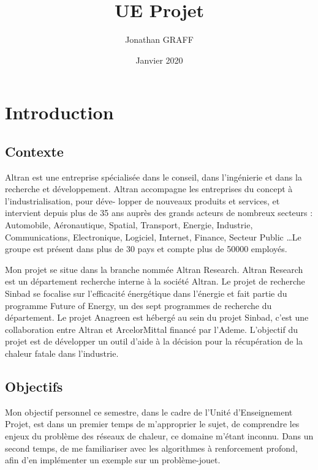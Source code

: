 


\renewcommand{\thesection}{\Roman{section})}
\renewcommand{\thesubsection}{\Roman{section}.\arabic{subsection})}
\renewcommand{\contentsname}{Sommaire}
\renewcommand{\bibname}{Bibliographie}
\title{UE Projet}
\author{Jonathan GRAFF}
\date{Janvier 2020}
\maketitle
\tableofcontents
\newpage

\section{Introduction}
\subsection{Contexte}

Altran est une entreprise spécialisée dans le conseil, dans l'ingénierie et dans la recherche et développement. Altran accompagne les entreprises du concept à l'industrialisation, pour déve-
lopper de nouveaux produits et services, et intervient depuis plus de 35 ans auprès des grands
acteurs de nombreux secteurs : Automobile, Aéronautique, Spatial, Transport, Energie, Industrie, Communications, Electronique, Logiciel, Internet, Finance, Secteur Public \dots Le groupe est présent dans plus de 30 pays et compte plus de 50000 employés.

Mon projet se situe dans la branche nommée Altran Research. Altran Research est un département recherche interne à la société Altran. Le projet de recherche Sinbad se focalise sur
l'efficacité énergétique dans l'énergie et fait partie du programme Future of Energy, un des sept programmes de recherche du département. Le projet Anagreen est hébergé au sein du projet
Sinbad, c'est une collaboration entre Altran et ArcelorMittal financé par l'Ademe. L'objectif du projet est de développer un outil d'aide à la décision pour la récupération de la chaleur fatale dans l'industrie.

\subsection{Objectifs}

Mon objectif personnel ce semestre, dans le cadre de l'Unité d'Enseignement Projet, est dans un premier temps de m'approprier le sujet, de comprendre les enjeux du problème des réseaux de chaleur, ce domaine m'étant inconnu. Dans un second temps, de me familiariser avec les algorithmes à renforcement profond, afin d'en implémenter un exemple sur un problème-jouet. 

